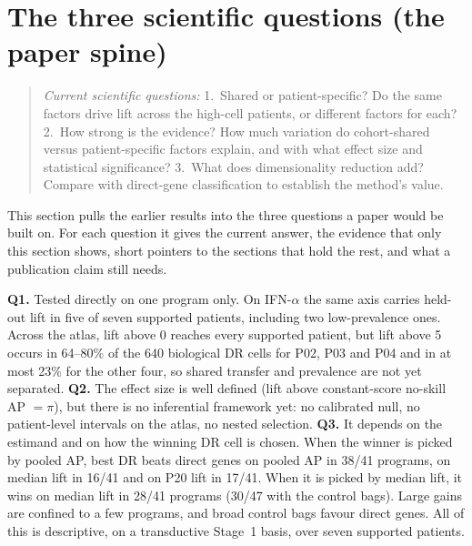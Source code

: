\section{The three scientific questions (the paper spine)}
\label{sec:three-questions}

\begin{quote}
\emph{Current scientific questions:}
1.~Shared or patient-specific? Do the same factors drive lift across the high-cell patients, or different factors for each?
2.~How strong is the evidence? How much variation do cohort-shared versus patient-specific factors explain, and with what effect size and statistical significance?
3.~What does dimensionality reduction add? Compare with direct-gene classification to establish the method's value.
\end{quote}

This section pulls the earlier results into the three questions a paper would be built on. For each question it gives the current answer, the evidence that only this section shows, short pointers to the sections that hold the rest, and what a publication claim still needs.

\begin{answerbox}
\textbf{Q1.} Tested directly on one program only. On IFN-$\alpha$ the same axis carries held-out lift in five of seven supported patients, including two low-prevalence ones. Across the atlas, lift above 0 reaches every supported patient, but lift above 5\pp{} occurs in 64--80\% of the 640 biological DR cells for P02, P03 and P04 and in at most 23\% for the other four, so shared transfer and prevalence are not yet separated.
\textbf{Q2.} The effect size is well defined (lift above constant-score no-skill AP $=\pi$), but there is no inferential framework yet: no calibrated null, no patient-level intervals on the atlas, no nested selection.
\textbf{Q3.} It depends on the estimand and on how the winning DR cell is chosen. When the winner is picked by pooled AP, best DR beats direct genes on pooled AP in 38/41 programs, on median lift in 16/41 and on P20 lift in 17/41. When it is picked by median lift, it wins on median lift in 28/41 programs (30/47 with the control bags). Large gains are confined to a few programs, and broad control bags favour direct genes.
All of this is descriptive, on a transductive Stage~1 basis, over seven supported patients.
\end{answerbox}

